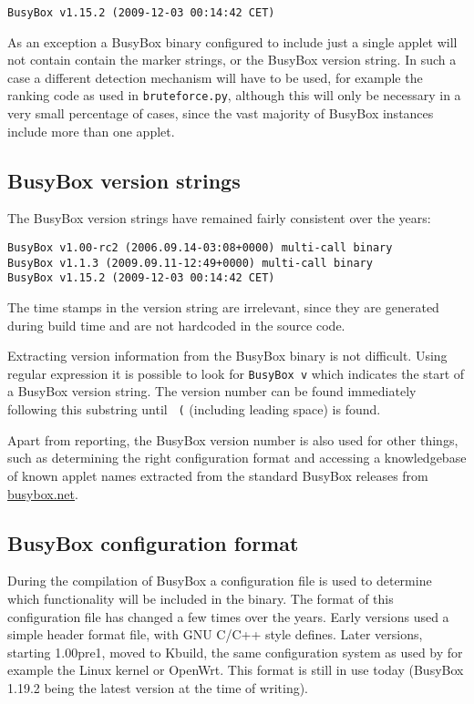 \documentclass[10pt]{article}
\begin{document}
\begin{verbatim}
BusyBox v1.15.2 (2009-12-03 00:14:42 CET)
\end{verbatim}

As an exception a BusyBox binary configured to include just a single applet
will not contain contain the marker strings, or the BusyBox version string. In
such a case a different detection mechanism will have to be used, for example
the ranking code as used in \texttt{bruteforce.py}, although this will only be
necessary in a very small percentage of cases, since the vast majority of
BusyBox instances include more than one applet.

\subsection{BusyBox version strings}

The BusyBox version strings have remained fairly consistent over the years:

\begin{verbatim}
BusyBox v1.00-rc2 (2006.09.14-03:08+0000) multi-call binary
BusyBox v1.1.3 (2009.09.11-12:49+0000) multi-call binary
BusyBox v1.15.2 (2009-12-03 00:14:42 CET)
\end{verbatim}

The time stamps in the version string are irrelevant, since they are generated
during build time and are not hardcoded in the source code.

Extracting version information from the BusyBox binary is not difficult.
Using regular expression it is possible to look for \texttt{BusyBox v} which
indicates the start of a BusyBox version string. The version number can be
found immediately following this substring until \texttt{ (} (including
leading space) is found.

Apart from reporting, the BusyBox version number is also used for other
things, such as determining the right configuration format and accessing a
knowledgebase of known applet names extracted from the standard BusyBox
releases from \url{busybox.net}.

\subsection{BusyBox configuration format}

During the compilation of BusyBox a configuration file is used to determine
which functionality will be included in the binary. The format of this
configuration file has changed a few times over the years. Early versions used
a simple header format file, with GNU C/C++ style defines. Later versions,
starting 1.00pre1, moved to Kbuild, the same configuration system as used by
for example the Linux kernel or OpenWrt. This format is still in use today
(BusyBox 1.19.2 being the latest version at the time of writing).
\end{document}
